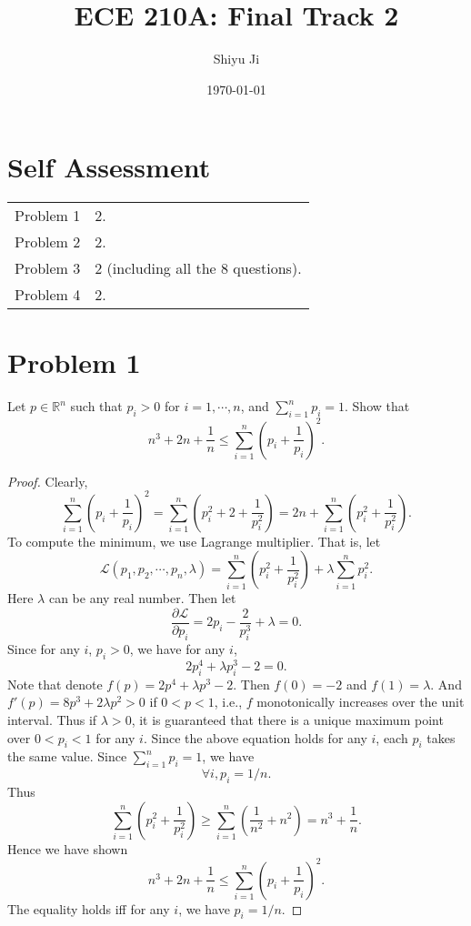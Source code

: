 \documentclass[12pt]{article}
\theoremstyle{plain}
\begin{document}
\title{ECE 210A: Final Track 2}
\author{Shiyu Ji}
\date{\today}
\maketitle

\newcommand{\m}[1]{\begin{pmatrix}#1\end{pmatrix}}
\newcommand{\rank}[1]{\operatorname{rank}(#1)}

\section{Self Assessment}

\begin{tabular}{c|l}
Problem 1 & 2.\\
Problem 2 & 2.\\
Problem 3 & 2 (including all the 8 questions).\\
Problem 4 & 2.\\
\end{tabular}

\section{Problem 1}
Let $p\in\mathbb{R}^n$ such that $p_i > 0$ for $i=1,\cdots,n$, and $\sum_{i=1}^n p_i = 1$. Show that
$$n^3 + 2n + \frac{1}{n} \leq \sum_{i=1}^n \left(p_i + \frac{1}{p_i} \right)^2.$$

\begin{proof}
Clearly,
$$\sum_{i=1}^n \left(p_i + \frac{1}{p_i} \right)^2 = \sum_{i=1}^n \left( p_i^2 + 2 + \frac{1}{p_i^2} \right) = 2n + \sum_{i=1}^n \left(p_i^2+\frac{1}{p_i^2}\right).$$
To compute the minimum, we use Lagrange multiplier. That is, let
$$\mathcal{L}(p_1,p_2,\cdots,p_n, \lambda) = \sum_{i=1}^n \left(p_i^2+\frac{1}{p_i^2}\right) + \lambda \sum_{i=1}^n p_i^2.$$
Here $\lambda$ can be any real number. 
Then let
$$\frac{\partial \mathcal{L}}{\partial p_i} = 2p_i - \frac{2}{p_i^3} + \lambda =0.$$
Since for any $i$, $p_i>0$, we have for any $i$,
$$2p_i^4 + \lambda p_i^3 -2 = 0.$$
Note that denote $f(p) = 2p^4 + \lambda p^3 - 2$. Then $f(0) = -2$ and $f(1) = \lambda$. And $f'(p) = 8p^3 + 2\lambda p^2 > 0$ if $0<p<1$, i.e., $f$ monotonically increases over the unit interval. Thus if $\lambda > 0$, it is guaranteed that there is a unique maximum point over $0<p_i<1$ for any $i$. Since the above equation holds for any $i$, each $p_i$ takes the same value. Since $\sum_{i=1}^n p_i = 1$, we have 
$$\forall i, p_i = 1/n.$$
Thus
$$\sum_{i=1}^n \left(p_i^2+\frac{1}{p_i^2}\right) \geq \sum_{i=1}^n \left( \frac{1}{n^2} + n^2\right) = n^3 + \frac{1}{n}.$$
Hence we have shown
$$n^3 + 2n + \frac{1}{n} \leq \sum_{i=1}^n \left(p_i + \frac{1}{p_i} \right)^2.$$
The equality holds iff for any $i$, we have $p_i=1/n$.
\end{proof}
\end{document}
